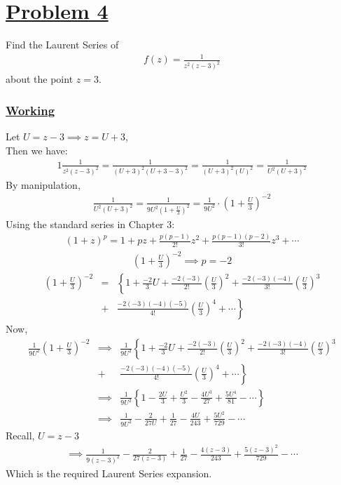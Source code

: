 \documentclass[11pt]{report}
\newcommand{\ubt}[1]{\textbf{\underline{#1}}}
\newcommand{\sps}{\\[0.2cm]}
\newcommand{\problem}[1]{\section*{\ubt{Problem #1}}}
\newcommand{\working}{\subsubsection{\ubt{Working}}}
\begin{document}
	\problem{4}
	Find the Laurent Series of 
	\begin{eqnarray*}
		f(z) = \frac{1}{z^2(z-3)^2}
	\end{eqnarray*}
	about the point $z=3$.
	\working
	Let $U=z-3\implies z=U+3$,
	\\Then we have:
	\begin{eqnarray*}
		1\frac{1}{z^2(z-3)^2} = \frac{1}{(U+3)^2(U+3-3)^2} = \frac{1}{(U+3)^2 (U)^2} = \frac{1}{U^2(U+3)^2}
	\end{eqnarray*}
	By manipulation,
	\begin{eqnarray*}
		\frac{1}{U^2(U+3)^2} = \frac{1}{9U^2\left(1+\frac{U}{3}\right)^2} = \frac{1}{9U^2}\cdot \left(1+\frac{U}{3}\right)^{-2}
	\end{eqnarray*}
	Using the standard series in Chapter 3:
	\begin{eqnarray*}
		(1+z)^p = 1+ pz + \frac{p(p-1)}{2!}z^2 + \frac{p(p-1)(p-2)}{3!}z^3 + \cdots
	\end{eqnarray*}
	\begin{eqnarray*}
		\left(1+\frac{U}{3}\right)^{-2} \implies p = - 2
	\end{eqnarray*}
	\begin{eqnarray*}
		\left(1+\frac{U}{3}\right)^{-2} &=& \left\{ 1 + \frac{-2}{3}U + \frac{-2(-3)}{2!}\left(\frac{U}{3}\right)^2 + \frac{-2(-3)(-4)}{3!}\left(\frac{U}{3}\right)^3\right. \sps
		 &+&\left. \frac{-2(-3)(-4)(-5)}{4!}\left(\frac{U}{3}\right)^4 + \cdots \right\}
	\end{eqnarray*}
	Now,
	\begin{eqnarray*}
		\frac{1}{9U^2}\left(1+\frac{U}{3}\right)^{-2} &\implies& \frac{1}{9U^2}\left\{ 1 + \frac{-2}{3}U + \frac{-2(-3)}{2!}\left(\frac{U}{3}\right)^2 + \frac{-2(-3)(-4)}{3!}\left(\frac{U}{3}\right)^3\right. \sps
		&+&\left. \frac{-2(-3)(-4)(-5)}{4!}\left(\frac{U}{3}\right)^4 + \cdots \right\}\sps
		&\implies& \frac{1}{9U^2}\left\{1-\frac{2U}{3}+\frac{U^2}{3} - \frac{4U^3}{27} + \frac{5U^4}{81} - \cdots\right\}\sps
		&\implies& \frac{1}{9U^2} - \frac{2}{27U} + \frac{1}{27} - \frac{4U}{243} + \frac{5U^2}{729} - \cdots
	\end{eqnarray*}
	Recall, $U = z-3$
	\begin{eqnarray*}
		\implies \frac{1}{9(z-3)^2} - \frac{2}{27(z-3)} + \frac{1}{27} - \frac{4(z-3)}{243} + \frac{5(z-3)^2}{729} - \cdots
	\end{eqnarray*}
	Which is the required Laurent Series expansion.
\end{document}
